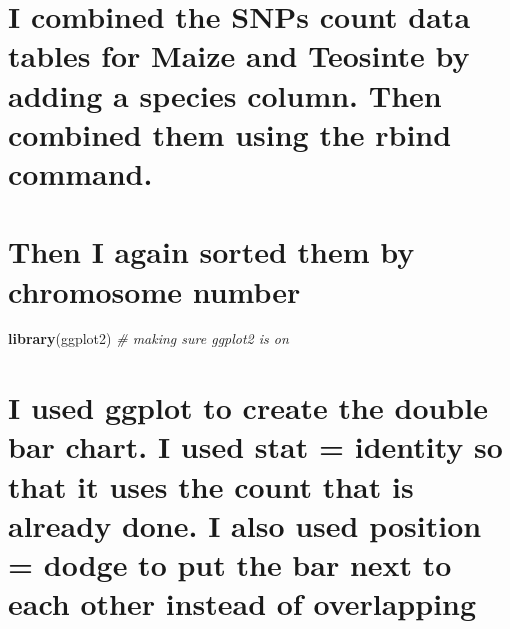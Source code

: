 \documentclass[
]{article}
\newenvironment{Shaded}{\begin{snugshade}}{\end{snugshade}}
\newcommand{\AttributeTok}[1]{\textcolor[rgb]{0.13,0.29,0.53}{#1}}
\newcommand{\CommentTok}[1]{\textcolor[rgb]{0.56,0.35,0.01}{\textit{#1}}}
\newcommand{\DecValTok}[1]{\textcolor[rgb]{0.00,0.00,0.81}{#1}}
\newcommand{\FunctionTok}[1]{\textcolor[rgb]{0.13,0.29,0.53}{\textbf{#1}}}
\newcommand{\NormalTok}[1]{#1}
\newcommand{\OtherTok}[1]{\textcolor[rgb]{0.56,0.35,0.01}{#1}}
\newcommand{\SpecialCharTok}[1]{\textcolor[rgb]{0.81,0.36,0.00}{\textbf{#1}}}
\newcommand{\StringTok}[1]{\textcolor[rgb]{0.31,0.60,0.02}{#1}}
\begin{document}
\section{I combined the SNPs count data tables for Maize and Teosinte by
adding a species column. Then combined them using the rbind
command.}\label{i-combined-the-snps-count-data-tables-for-maize-and-teosinte-by-adding-a-species-column.-then-combined-them-using-the-rbind-command.}

\section{Then I again sorted them by chromosome
number}\label{then-i-again-sorted-them-by-chromosome-number}

\begin{Shaded}
\end{Shaded}

\begin{Shaded}
\begin{Highlighting}[]
\FunctionTok{library}\NormalTok{(ggplot2) }\CommentTok{\# making sure ggplot2 is on}
\end{Highlighting}
\end{Shaded}

\section{I used ggplot to create the double bar chart. I used stat =
identity so that it uses the count that is already done. I also used
position = dodge to put the bar next to each other instead of
overlapping}\label{i-used-ggplot-to-create-the-double-bar-chart.-i-used-stat-identity-so-that-it-uses-the-count-that-is-already-done.-i-also-used-position-dodge-to-put-the-bar-next-to-each-other-instead-of-overlapping}
\end{document}
